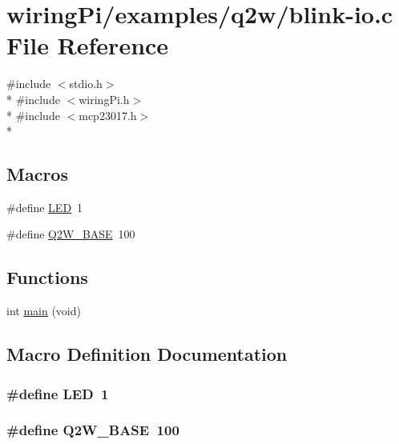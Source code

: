 \hypertarget{blink-io_8c}{\section{wiring\-Pi/examples/q2w/blink-\/io.c File Reference}
\label{blink-io_8c}
}
{\ttfamily \#include $<$stdio.\-h$>$}\\*
{\ttfamily \#include $<$wiring\-Pi.\-h$>$}\\*
{\ttfamily \#include $<$mcp23017.\-h$>$}\\*
\subsection*{Macros}
\begin{DoxyCompactItemize}
\item 
\#define \hyperlink{blink-io_8c_aeb7a7ba1ab7e0406f1b5ab36d579f585}{L\-E\-D}~1
\item 
\#define \hyperlink{blink-io_8c_ade41d34fa5a8e64b1fcbd8ee11f61c37}{Q2\-W\-\_\-\-B\-A\-S\-E}~100
\end{DoxyCompactItemize}
\subsection*{Functions}
\begin{DoxyCompactItemize}
\item 
int \hyperlink{blink-io_8c_a840291bc02cba5474a4cb46a9b9566fe}{main} (void)
\end{DoxyCompactItemize}


\subsection{Macro Definition Documentation}
\hypertarget{blink-io_8c_aeb7a7ba1ab7e0406f1b5ab36d579f585}{
\subsubsection[{L\-E\-D}]{\setlength{\rightskip}{0pt plus 5cm}\#define L\-E\-D~1}}\label{blink-io_8c_aeb7a7ba1ab7e0406f1b5ab36d579f585}
\hypertarget{blink-io_8c_ade41d34fa5a8e64b1fcbd8ee11f61c37}{
\subsubsection[{Q2\-W\-\_\-\-B\-A\-S\-E}]{\setlength{\rightskip}{0pt plus 5cm}\#define Q2\-W\-\_\-\-B\-A\-S\-E~100}}\label{blink-io_8c_ade41d34fa5a8e64b1fcbd8ee11f61c37}


